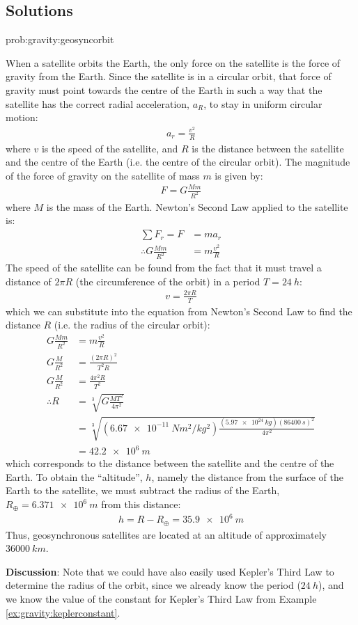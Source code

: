 \subsection{Solutions}
\begin{solution}{prob:gravity:geosyncorbit}\label{soln:gravity:geosyncorbit}
{When a satellite orbits the Earth, the only force on the satellite is the force of gravity from the Earth. Since the satellite is in a circular orbit, that force of gravity must point towards the centre of the Earth in such a way that the satellite has the correct radial acceleration, $a_R$, to stay in uniform circular motion:
\begin{align*}
a_r=\frac{v^2}{R}
\end{align*}
where $v$ is the speed of the satellite, and $R$ is the distance between the satellite and the centre of the Earth (i.e. the centre of the circular orbit). The magnitude of the force of gravity on the satellite of mass $m$ is given by:
\begin{align*}
F = G\frac{Mm}{R^2}
\end{align*}
where $M$ is the mass of the Earth. Newton's Second Law applied to the satellite is:
\begin{align*}
\sum F_r = F &= ma_r\\
\therefore G\frac{Mm}{R^2}&=m\frac{v^2}{R}
\end{align*}
The speed of the satellite can be found from the fact that it must travel a distance of $2\pi R$ (the circumference of the orbit) in a period $T=\SI{24}{h}$:
\begin{align*}
v=\frac{2\pi R}{T}
\end{align*}
which we can substitute into the equation from Newton's Second Law to find the distance $R$ (i.e. the radius of the circular orbit):
\begin{align*}
G\frac{Mm}{R^2}&=m\frac{v^2}{R}\\
G\frac{M}{R^2}&=\frac{(2\pi R)^2}{T^2R}\\ 
G\frac{M}{R^2}&=\frac{4\pi^2 R}{T^2}\\ 
\therefore R&=\sqrt[3]{G\frac{MT^2}{4\pi^2}}\\
&=\sqrt[3]{(\SI{6.67e-11}{Nm^2/kg^2})\frac{(\SI{5.97e24}{kg})(\SI{86400}{s})^2}{4\pi^2}}\\
&=\SI{42.2e6}{m}
\end{align*}
which corresponds to the distance between the satellite and the centre of the Earth. To obtain the ``altitude'', $h$, namely the distance from the surface of the Earth to the satellite, we must subtract the radius of the Earth, $R_\oplus=\SI{6.371e6}{m}$ from this distance:
\begin{align*}
h = R-R_\oplus = \SI{35.9e6}{m}
\end{align*}
Thus, geosynchronous satellites are located at an altitude of approximately $\SI{36000}{km}$.

\textbf{Discussion}: Note that we could have also easily used Kepler's Third Law to determine the radius of the orbit, since we already know the period ($\SI{24}{h}$), and we know the value of the constant for Kepler's Third Law from Example \ref{ex:gravity:keplerconstant}.
}
\end{solution}

